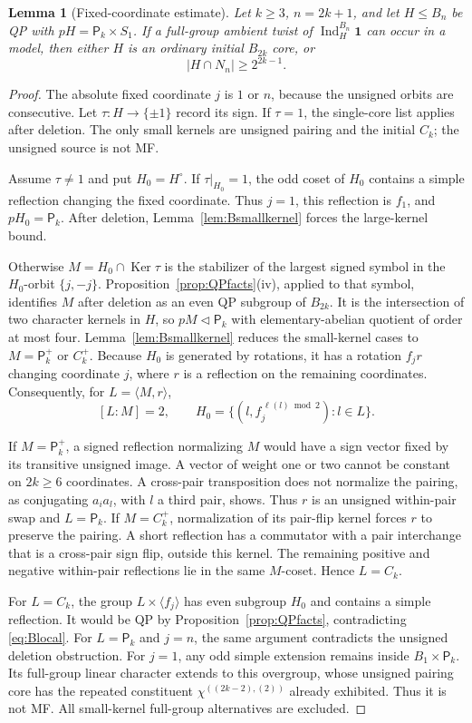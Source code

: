 \documentclass[11pt]{article}
\numberwithin{equation}{section}
\newtheorem{lemma}[theorem]{Lemma}
\theoremstyle{definition}
\DeclareMathOperator{\Ind}{Ind}
\DeclareMathOperator{\Ker}{Ker}
\newcommand{\one}{\mathbf 1}
\newcommand{\pair}{\mathsf P}
\begin{document}
\begin{lemma}[Fixed-coordinate estimate]\label{lem:Bfixed}
Let \(k\geq3\), \(n=2k+1\), and let \(H\leq B_n\) be QP with \(pH=\pair_k\times S_1\).
If a full-group ambient twist of \(\Ind_H^{B_n}\one\) can occur in a model, then either \(H\) is an ordinary initial \(B_{2k}\) core, or
\[
 |H\cap N_n|\geq2^{2k-1}.
\]
\end{lemma}
\begin{proof}
The absolute fixed coordinate \(j\) is \(1\) or \(n\), because the unsigned orbits are consecutive.
Let \(\tau:H\to\{\pm1\}\) record its sign.
If \(\tau=1\), the single-core list applies after deletion.
The only small kernels are unsigned pairing and the initial \(C_k\); the unsigned source is not MF.

Assume \(\tau\ne1\) and put \(H_0=H^\circ\).
If \(\tau|_{H_0}=1\), the odd coset of \(H_0\) contains a simple reflection changing the fixed coordinate.
Thus \(j=1\), this reflection is \(f_1\), and \(pH_0=\pair_k\).
After deletion, Lemma~\ref{lem:Bsmallkernel} forces the large-kernel bound.

Otherwise \(M=H_0\cap\Ker\tau\) is the stabilizer of the largest signed symbol in the \(H_0\)-orbit \(\{j,-j\}\).
Proposition~\ref{prop:QPfacts}(iv), applied to that symbol, identifies \(M\) after deletion as an even QP subgroup of \(B_{2k}\).
It is the intersection of two character kernels in \(H\), so \(pM\lhd\pair_k\) with elementary-abelian quotient of order at most four.
Lemma~\ref{lem:Bsmallkernel} reduces the small-kernel cases to
\(M=\pair_k^+\) or \(C_k^+\).
Because \(H_0\) is generated by rotations, it has a rotation \(f_jr\) changing coordinate \(j\), where \(r\) is a reflection on the remaining coordinates.
Consequently, for \(L=\langle M,r\rangle\),
\[
 [L:M]=2,\qquad
 H_0=\{(l,f_j^{\,\ell(l)\bmod2}):l\in L\}.
\]

If \(M=\pair_k^+\), a signed reflection normalizing \(M\) would have a sign vector fixed by its transitive unsigned image.
A vector of weight one or two cannot be constant on \(2k\geq6\) coordinates.
A cross-pair transposition does not normalize the pairing, as conjugating \(a_i a_l\), with \(l\) a third pair, shows.
Thus \(r\) is an unsigned within-pair swap and \(L=\pair_k\).
If \(M=C_k^+\), normalization of its pair-flip kernel forces \(r\) to preserve the pairing.
A short reflection has a commutator with a pair interchange that is a cross-pair sign flip, outside this kernel.
The remaining positive and negative within-pair reflections lie in the same \(M\)-coset.
Hence \(L=C_k\).

For \(L=C_k\), the group \(L\times\langle f_j\rangle\) has even subgroup \(H_0\) and contains a simple reflection.
It would be QP by Proposition~\ref{prop:QPfacts}, contradicting \eqref{eq:Blocal}.
For \(L=\pair_k\) and \(j=n\), the same argument contradicts the unsigned deletion obstruction.
For \(j=1\), any odd simple extension remains inside \(B_1\times\pair_k\).
Its full-group linear character extends to this overgroup, whose unsigned pairing core has the repeated constituent \(\chi^{((2k-2),(2))}\) already exhibited.
Thus it is not MF.
All small-kernel full-group alternatives are excluded.
\end{proof}
\end{document}
